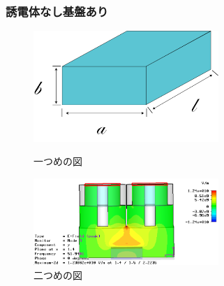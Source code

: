 \subsubsection{誘電体なし基盤あり}
\begin{figure}[h]
 \begin{minipage}{0.5\hsize}
  \begin{center}
   \includegraphics[width=70mm]{./image/空洞共振器.png}
  \end{center}
  \caption{一つめの図}
  \label{fig:one}
 \end{minipage}
 \begin{minipage}{0.5\hsize}
  \begin{center}
   \includegraphics[width=70mm]{./image/model73_kiban_e_y_y.png}
  \end{center}
  \caption{二つめの図}
  \label{fig:two}
 \end{minipage}
\end{figure}

